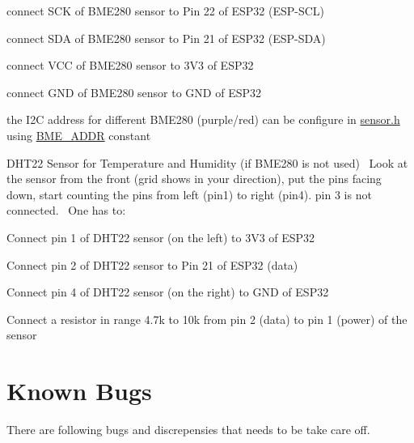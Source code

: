 \begin{DoxyEnumerate}
\begin{DoxyItemize}
\item connect S\+CK of B\+M\+E280 sensor to Pin 22 of E\+S\+P32 (E\+S\+P-\/\+S\+CL)
\item connect S\+DA of B\+M\+E280 sensor to Pin 21 of E\+S\+P32 (E\+S\+P-\/\+S\+DA)
\item connect V\+CC of B\+M\+E280 sensor to 3V3 of E\+S\+P32
\item connect G\+ND of B\+M\+E280 sensor to G\+ND of E\+S\+P32
\item the I2C address for different B\+M\+E280 (purple/red) can be configure in \mbox{\hyperlink{sensor_8h}{sensor.\+h}} using \mbox{\hyperlink{sensor_8h_a9f6149e98e70e1d5be5f0f33921cb7d7}{B\+M\+E\+\_\+\+A\+D\+DR}} constant
\end{DoxyItemize}
\item D\+H\+T22 Sensor for Temperature and Humidity (if B\+M\+E280 is not used)~\newline
 Look at the sensor from the front (grid shows in your direction), put the pins facing down, start counting the pins from left (pin1) to right (pin4). pin 3 is not connected.~\newline
 One has to\+:
\begin{DoxyItemize}
\item Connect pin 1 of D\+H\+T22 sensor (on the left) to 3V3 of E\+S\+P32
\item Connect pin 2 of D\+H\+T22 sensor to Pin 21 of E\+S\+P32 (data)
\item Connect pin 4 of D\+H\+T22 sensor (on the right) to G\+ND of E\+S\+P32
\item Connect a resistor in range 4.\+7k to 10k from pin 2 (data) to pin 1 (power) of the sensor
\end{DoxyItemize}
\end{DoxyEnumerate}\hypertarget{index_knownbugs}{}\section{Known Bugs}\label{index_knownbugs}
There are following bugs and discrepensies that needs to be take care off.
